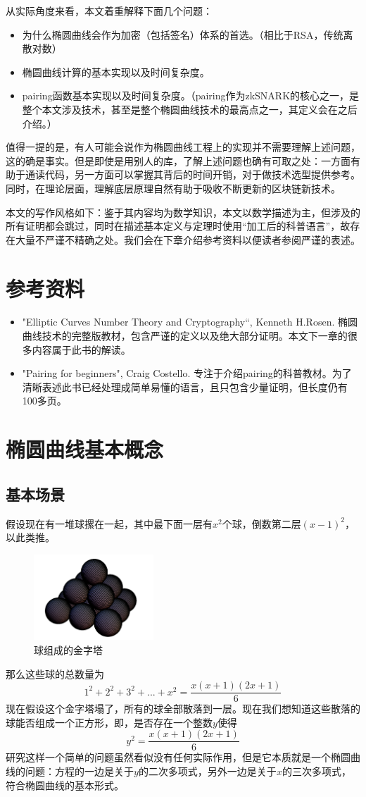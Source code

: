 \documentclass[12pt]{article}
\newcommand{\ec}{椭圆曲线}
\begin{document}
从实际角度来看，本文着重解释下面几个问题：
\begin{itemize}
	\item 为什么椭圆曲线会作为加密（包括签名）体系的首选。（相比于RSA，传统离散对数）
	\item 椭圆曲线计算的基本实现以及时间复杂度。
	\item pairing函数基本实现以及时间复杂度。（pairing作为zkSNARK的核心之一，是整个本文涉及技术，甚至是整个椭圆曲线技术的最高点之一，其定义会在之后介绍。）
\end{itemize}
值得一提的是，有人可能会说作为椭圆曲线工程上的实现并不需要理解上述问题，这的确是事实。但是即使是用别人的库，了解上述问题也确有可取之处：一方面有助于通读代码，另一方面可以掌握其背后的时间开销，对于做技术选型提供参考。同时，在理论层面，理解底层原理自然有助于吸收不断更新的区块链新技术。

本文的写作风格如下：鉴于其内容均为数学知识，本文以数学描述为主，但涉及的所有证明都会跳过，同时在描述基本定义与定理时使用“加工后的科普语言”，故存在大量不严谨不精确之处。我们会在下章介绍参考资料以便读者参阅严谨的表述。
\section{参考资料}
\begin{itemize}
\item "Elliptic Curves Number Theory and Cryptography“, Kenneth H.Rosen. 椭圆曲线技术的完整版教材，包含严谨的定义以及绝大部分证明。本文下一章的很多内容属于此书的解读。
\item "Pairing for beginners", Craig Costello. 专注于介绍pairing的科普教材。为了清晰表述此书已经处理成简单易懂的语言，且只包含少量证明，但长度仍有100多页。
\end{itemize}
\section{椭圆曲线基本概念}
\subsection{基本场景}
假设现在有一堆球摞在一起，其中最下面一层有$x^2$个球，倒数第二层$(x-1)^2$，以此类推。
\begin{figure}[H]
	\centering
	\label{fig:balls}
	\includegraphics[width=0.4\textwidth]{../common/ball.png}
	\caption{球组成的金字塔}
\end{figure}
那么这些球的总数量为
$$1^2+2^2+3^2+...+x^2=\frac{x(x+1)(2x+1)}{6}$$
现在假设这个金字塔塌了，所有的球全部散落到一层。现在我们想知道这些散落的球能否组成一个正方形，即，是否存在一个整数$y$使得
$$y^2=\frac{x(x+1)(2x+1)}{6}$$
研究这样一个简单的问题虽然看似没有任何实际作用，但是它本质就是一个椭圆曲线的问题：方程的一边是关于$y$的二次多项式，另外一边是关于$x$的三次多项式，符合\ec 的基本形式。
\end{document}
